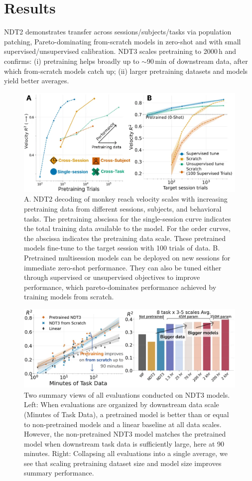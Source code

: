 \documentclass[12pt,oneside]{report}
\begin{document}
\section{Results}
NDT2 demonstrates transfer across sessions/subjects/tasks via population patching, Pareto-dominating from-scratch models in zero-shot and with small supervised/unsupervised calibration. NDT3 scales pretraining to 2000\,h and confirms: (i) pretraining helps broadly up to $\sim$90\,min of downstream data, after which from-scratch models catch up; (ii) larger pretraining datasets and models yield better averages.

\begin{figure}[h]
  \centering
  \includegraphics[width=0.5\linewidth]{ch2_ndt2_results.png}
  \caption{A. NDT2 decoding of monkey reach velocity scales with increasing pretraining data from different sessions, subjects, and behavioral tasks. The pretraining abscissa for the single-session curve indicates the total training data available to the model. For the order curves, the abscissa indicates the pretraining data scale. These pretrained models fine-tune to the target session with 100 trials of data. B. Pretrained multisession models can be deployed on new sessions for immediate zero-shot performance. They can also be tuned either through supervised or unsupervised objectives to improve performance, which pareto-dominates performance achieved by training models from scratch.}
  \label{fig:ndt2_results}
\end{figure}

\begin{figure}[h]
  \centering
  \includegraphics[width=0.5\linewidth]{ch2_ndt3_summary.png}
  \caption{Two summary views of all evaluations conducted on NDT3 models. Left: When evaluations are organized by downstream data scale (Minutes of Task Data), a pretrained model is better than or equal to non-pretrained models and a linear baseline at all data scales. However, the non-pretrained NDT3 model matches the pretrained model when downstream task data is sufficiently large, here at 90 minutes. Right: Collapsing all evaluations into a single average, we see that scaling pretraining dataset size and model size improves summary performance.}
  \label{fig:ndt3_summary}
\end{figure}
\end{document}

